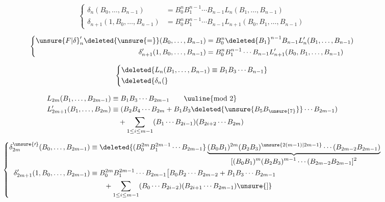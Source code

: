 \[
\left\{\begin{aligned}
\delta_n(B_0,\ldots,B_{n-1})&=B_0^n B_1^{n-1}\cdots B_{n-1}L_n(B_1,\ldots,B_{n-1})\\
\delta_{n+1}(1,B_0,\ldots,B_{n-1})&=B_0^n B_1^{n-1}\cdots B_{n-1}L_{n+1}(B_0,B_1,\ldots,B_{n-1})
\end{aligned}\right.
\]

\[
\left\{\begin{aligned}
\unsure{F|\delta}'_n\deleted{\unsure{=}}(B_0,\ldots,B_{n-1})&=B_0^n\deleted{B_1}^{n-1}B_{n-1}L'_n(B_1,\ldots,B_{n-1})\\
\delta'_{n+1}(1,B_0,\ldots,B_{n-1})&=B_0^n B_1^{n-1}\cdots B_{n-1}L'_{n+1}(B_0,B_1,\ldots,B_{n-1})
\end{aligned}\right.
\]


\[
\left\{\begin{aligned}
&\deleted{L_n(B_1,\ldots,B_{n-1})\equiv B_1 B_3\cdots B_{n-1}}\\
&\deleted{\delta_n(}
\end{aligned}\right.
\]


\[
\begin{aligned}
L_{2m}(B_1,\ldots,B_{2m-1})&\equiv B_1B_3\cdots B_{2m-1}\qquad \text{\uuline{mod 2}}\\
L'_{2m+1}(B_1,\ldots,B_{2m})&\equiv (B_2 B_4\cdots B_{2m}+B_1 B_3\deleted{\unsure{B_5 B_{\unsure{7}}}}\cdots B_{2m-1})\\
&\quad+\sum_{1\le i\le m-1}(B_1\cdots B_{2i-1})(B_{2i+2}\cdots B_{2m})
\end{aligned}
\]

\[
\left\{\begin{aligned}
\delta_{2m}^{\unsure{\prime}}(B_0,\ldots,B_{2m-1})&\equiv
\deleted{(B_0^{2m}B_1^{2m-1}\cdots B_{2m-1}}
\underbrace{(B_0 B_1)^{2m}(B_2B_3)^{\unsure{2(m-1)|2m-1}}\cdots(B_{2m-2}B_{2m-1})}_{\displaystyle [(B_0B_1)^m(B_2B_3)^{m-1}\cdots(B_{2m-2}B_{2m-1}]^2}\\
\delta'_{2m+1}(1,B_0,\ldots,B_{2m-1})&\equiv B_0^{2m} B_1^{2m-1}\cdots B_{2m-1}\bigl[B_0B_2\cdots B_{2m-2}+B_1B_3\cdots B_{2m-1}\\
&\qquad+\sum_{1\le i\le m-1}(B_0\cdots B_{2i-2})(B_{2i+1}\cdots B_{2m-1})\unsure{]}
\end{aligned}\right.
\]

